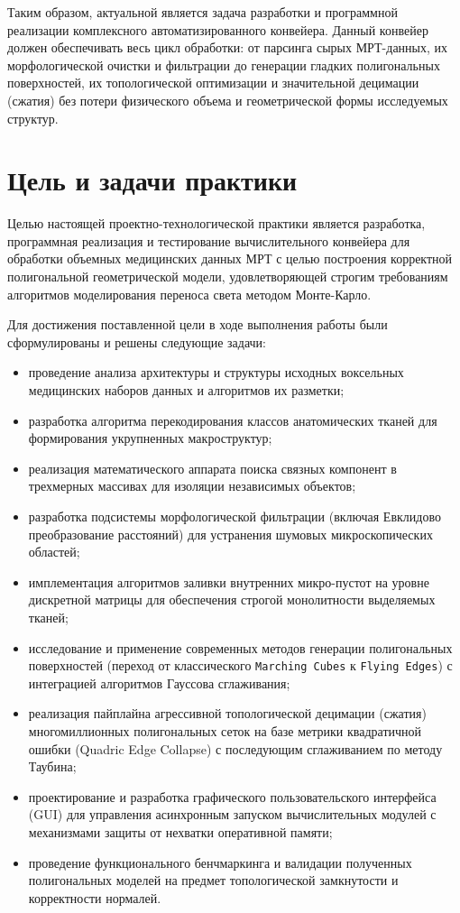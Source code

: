 \documentclass[a4paper,14pt]{article}
\begin{document}
Таким образом, актуальной является задача разработки и программной реализации комплексного автоматизированного конвейера. Данный конвейер должен обеспечивать весь цикл обработки: от парсинга сырых МРТ-данных, их морфологической очистки и фильтрации до генерации гладких полигональных поверхностей, их топологической оптимизации и значительной децимации (сжатия) без потери физического объема и геометрической формы исследуемых структур.

\newpage
\section{Цель и задачи практики}
Целью настоящей проектно-технологической практики является разработка, программная реализация и тестирование вычислительного конвейера для обработки объемных медицинских данных МРТ с целью построения корректной полигональной геометрической модели, удовлетворяющей строгим требованиям алгоритмов моделирования переноса света методом Монте-Карло.

Для достижения поставленной цели в ходе выполнения работы были сформулированы и решены следующие задачи:
\begin{itemize}
    \item проведение анализа архитектуры и структуры исходных воксельных медицинских наборов данных и алгоритмов их разметки;
    \item разработка алгоритма перекодирования классов анатомических тканей для формирования укрупненных макроструктур;
    \item реализация математического аппарата поиска связных компонент в трехмерных массивах для изоляции независимых объектов;
    \item разработка подсистемы морфологической фильтрации (включая Евклидово преобразование расстояний) для устранения шумовых микроскопических областей;
    \item имплементация алгоритмов заливки внутренних микро-пустот на уровне дискретной матрицы для обеспечения строгой монолитности выделяемых тканей;
    \item исследование и применение современных методов генерации полигональных поверхностей (переход от классического \texttt{Marching Cubes} к \texttt{Flying Edges}) с интеграцией алгоритмов Гауссова сглаживания;
    \item реализация пайплайна агрессивной топологической децимации (сжатия) многомиллионных полигональных сеток на базе метрики квадратичной ошибки (Quadric Edge Collapse) с последующим сглаживанием по методу Таубина;
    \item проектирование и разработка графического пользовательского интерфейса (GUI) для управления асинхронным запуском вычислительных модулей с механизмами защиты от нехватки оперативной памяти;
    \item проведение функционального бенчмаркинга и валидации полученных полигональных моделей на предмет топологической замкнутости и корректности нормалей.
\end{itemize}
\end{document}
